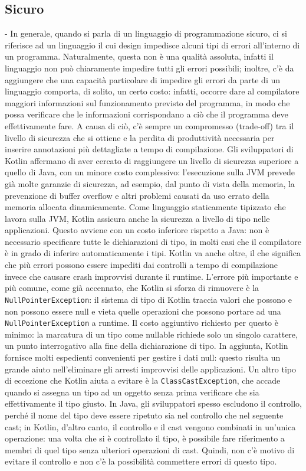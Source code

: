 \subsection{Sicuro}
- In generale, quando si parla di un linguaggio di programmazione sicuro, ci si riferisce ad un linguaggio il cui design impedisce alcuni tipi di errori all’interno di un programma. Naturalmente, questa non è una qualità assoluta, infatti il linguaggio non può chiaramente impedire tutti gli errori possibili; inoltre, c’è da aggiungere che una capacità particolare di impedire gli errori da parte di un linguaggio comporta, di solito, un certo costo: infatti, occorre dare al compilatore maggiori informazioni sul funzionamento previsto del programma, in modo che possa verificare che le informazioni corrispondano a ciò che il programma deve effettivamente fare. A causa di ciò, c'è sempre un compromesso (trade-off) tra il livello di sicurezza che si ottiene e la perdita di produttività necessaria per inserire annotazioni più dettagliate a tempo di compilazione. Gli sviluppatori di Kotlin affermano di aver cercato di raggiungere un livello di sicurezza superiore a quello di Java, con un minore costo complessivo: l'esecuzione sulla JVM prevede già molte garanzie di sicurezza, ad esempio, dal punto di vista della memoria, la prevenzione di buffer overflow e altri problemi causati da uso errato della memoria allocata dinamicamente. Come linguaggio staticamente tipizzato che lavora sulla JVM, Kotlin assicura anche la sicurezza a livello di tipo nelle applicazioni. Questo avviene con un costo inferiore rispetto a Java: non è necessario specificare tutte le dichiarazioni di tipo, in molti casi che il compilatore è in grado di inferire automaticamente i tipi. Kotlin va anche oltre, il che significa che più errori possono essere impediti dai controlli a tempo di compilazione invece che causare crash improvvisi durante il runtime. L’errore più importante e più comune, come già accennato, che Kotlin si sforza di rimuovere è la \texttt{NullPointerException}: il sistema di tipo di Kotlin traccia valori che possono e non possono essere null e vieta quelle operazioni che possono portare ad una \texttt{NullPointerException} a runtime. Il costo aggiuntivo richiesto per questo è minimo: la marcatura di un tipo come nullable richiede solo un singolo carattere, un punto interrogativo alla fine della dichiarazione di tipo. In aggiunta, Kotlin fornisce molti espedienti convenienti per gestire i dati null: questo risulta un grande aiuto nell'eliminare gli arresti improvvisi delle applicazioni. Un altro tipo di eccezione che Kotlin aiuta a evitare è la \texttt{ClassCastException}, che accade quando si assegna un tipo ad un oggetto senza prima verificare che sia effettivamente il tipo giusto. In Java, gli sviluppatori spesso escludono il controllo, perché il nome del tipo deve essere ripetuto sia nel controllo che nel seguente cast; in Kotlin, d'altro canto, il controllo e il cast vengono combinati in un'unica operazione: una volta che si è controllato il tipo, è possibile fare riferimento a membri di quel tipo senza ulteriori operazioni di cast. Quindi, non c'è motivo di evitare il controllo e non c’è la possibilità commettere errori di questo tipo.\\

